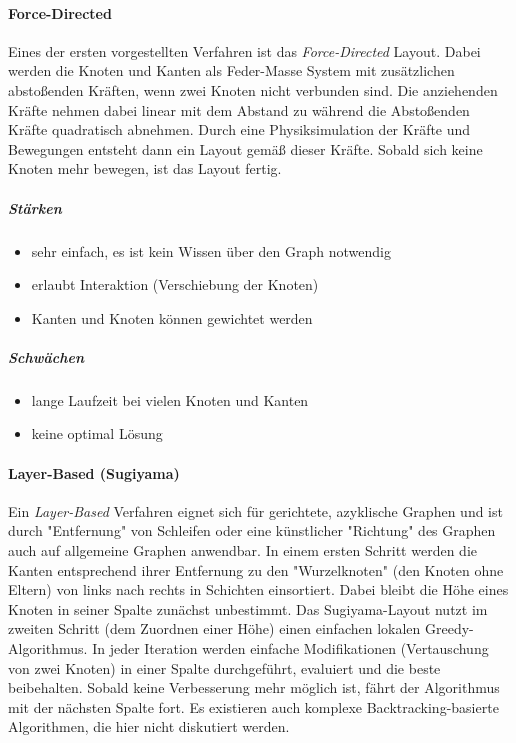 				\paragraph{Force-Directed}
					Eines der ersten vorgestellten Verfahren ist das \emph{Force-Directed} Layout. Dabei werden die Knoten und Kanten als Feder-Masse System mit zusätzlichen abstoßenden Kräften, wenn zwei Knoten nicht verbunden sind. Die anziehenden Kräfte nehmen dabei linear mit dem Abstand zu während die Abstoßenden Kräfte quadratisch abnehmen. Durch eine Physiksimulation der Kräfte und Bewegungen entsteht dann ein Layout gemäß dieser Kräfte. Sobald sich keine Knoten mehr bewegen, ist das Layout fertig.

					\subparagraph{Stärken}
					\begin{itemize}
						\item sehr einfach, es ist kein Wissen über den Graph notwendig
						\item erlaubt Interaktion (\zB Verschiebung der Knoten)
						\item Kanten und Knoten können gewichtet werden
					\end{itemize}

					\subparagraph{Schwächen}
					\begin{itemize}
						\item lange Laufzeit bei vielen Knoten und Kanten
						\item keine optimal Lösung
					\end{itemize}

				\paragraph{Layer-Based (Sugiyama)}
					Ein \emph{Layer-Based} Verfahren eignet sich für gerichtete, azyklische Graphen und ist durch "Entfernung" von Schleifen oder eine künstlicher "Richtung" des Graphen auch auf allgemeine Graphen anwendbar. In einem ersten Schritt werden die Kanten entsprechend ihrer Entfernung zu den "Wurzelknoten" (den Knoten ohne Eltern) von links nach rechts in Schichten einsortiert. Dabei bleibt die Höhe eines Knoten in seiner Spalte zunächst unbestimmt. Das Sugiyama-Layout nutzt im zweiten Schritt (dem Zuordnen einer Höhe) einen einfachen lokalen Greedy-Algorithmus. In jeder Iteration werden einfache Modifikationen (\zB Vertauschung von zwei Knoten) in einer Spalte durchgeführt, evaluiert und die beste beibehalten. Sobald keine Verbesserung mehr möglich ist, fährt der Algorithmus mit der nächsten Spalte fort. Es existieren auch komplexe Backtracking-basierte Algorithmen, die hier nicht diskutiert werden.

